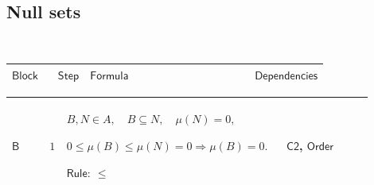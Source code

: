 \documentclass[12pt,reqno]{amsart}
\theoremstyle{blueplain}
\numberwithin{equation}{section}
\newlength{\DCTOneColumnBody}
\begin{document}
{\scriptsize \ }

\subsection{\protect\scriptsize Null sets}

{\scriptsize {\ }}

{\scriptsize \setlength{\parskip}{0pt}\nointerlineskip
\noindent 
\begin{tabular}{|@{}>{\centering\arraybackslash}m{\DCTOneColumnBody}|}
\hline
$\displaystyle \mathsf{NullSets}$ \\ \hline
\end{tabular}%
}

{\scriptsize \setlength{\parskip}{0pt}\nointerlineskip
\noindent 
\begin{tabular}{|@{}>{\centering\arraybackslash}m{0.10658\linewidth}|>{\centering\arraybackslash}m{0.03553\linewidth}|>{\centering\arraybackslash}m{0.52105\linewidth}|>{\centering\arraybackslash}m{0.23684\linewidth}|}
\hline
$\displaystyle \mathsf{Block}$ & $\displaystyle \mathsf{Step}$ & $%
\displaystyle \mathsf{Formula}$ & $\displaystyle \mathsf{Dependencies}$ \\ 
\hline
\end{tabular}%
}

{\scriptsize \setlength{\parskip}{0pt}\nointerlineskip
\noindent 
\begin{tabular}{|@{}>{\centering\arraybackslash}m{0.10658\linewidth}|>{\centering\arraybackslash}m{0.03553\linewidth}|>{\centering\arraybackslash}m{0.52105\linewidth}|>{\centering\arraybackslash}m{0.23684\linewidth}|}
\hline
\hypertarget{dct:B1}{$\displaystyle \mathsf{B}$} & $\displaystyle 1$ & $%
\displaystyle B,N\in A,\quad B\subseteq N,\quad\mu(N)=0,$\par$\displaystyle %
0\le\mu(B)\le\mu(N)=0\Rightarrow\mu(B)=0.$\par$\displaystyle \mathsf{Rule}:\
\le$ & \hyperlink{proof:C2}{$\displaystyle \mathsf{C2}$}, \hyperlink{ax:Order}%
{$\displaystyle \mathsf{Order}$} \\ \hline
\end{tabular}%
}
\end{document}
